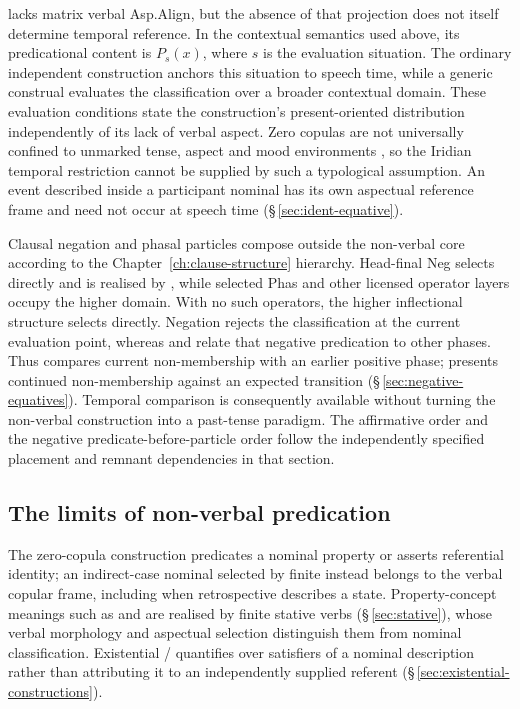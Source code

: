  lacks matrix verbal Asp.Align, but the absence of that projection
does not itself determine temporal reference. In the contextual semantics
used above, its predicational content is \(P_s(x)\), where \(s\) is the
evaluation situation. The ordinary independent construction anchors this
situation to speech time, while a generic construal evaluates the
classification over a broader contextual domain. These evaluation conditions
state the construction's present-oriented distribution independently of its
lack of verbal aspect. Zero copulas are not universally confined to
unmarked tense, aspect and mood environments
\cite[abstract]{stassen1994}, so the Iridian temporal restriction cannot
be supplied by such a typological assumption. An event described inside
a participant nominal has its own aspectual reference frame and need not
occur at speech time
(§\,\ref{sec:ident-equative}).

Clausal negation and phasal particles compose outside the non-verbal core
according to the Chapter~\ref{ch:clause-structure} hierarchy. Head-final
Neg selects  directly and is realised by , while
selected Phas and other licensed operator layers occupy the higher domain.
With no such operators, the higher inflectional structure selects
 directly. Negation rejects the classification at the current
evaluation point, whereas  and  relate that negative
predication to other phases. Thus   compares current non-membership with an earlier
positive phase;   presents continued non-membership against an expected transition
(§\,\ref{sec:negative-equatives}). Temporal comparison is consequently
available without turning the non-verbal construction into a past-tense
paradigm. The affirmative order  and the negative
predicate-before-particle order follow the independently specified placement
and remnant dependencies in that section.

\subsection{The limits of non-verbal predication}

The zero-copula construction predicates a nominal property or asserts
referential identity; an indirect-case nominal selected by finite
 instead belongs to the verbal copular frame, including when
retrospective  describes a state. Property-concept meanings such
as  and  are realised by finite stative
verbs (§\,\ref{sec:stative}), whose verbal morphology and aspectual
selection distinguish them from nominal classification. Existential
/ quantifies over satisfiers of a nominal description
rather than attributing it to an independently supplied referent
(§\,\ref{sec:existential-constructions}).

